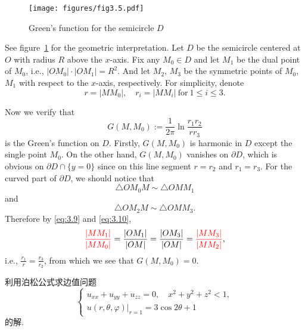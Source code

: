 \begin{solve}
  \begin{figure}
    \centering
    \texttt{[image: figures/fig3.5.pdf]}
    \caption{Green's function for the semicircle $D$}
    \label{fig:3.1}
  \end{figure}
  See figure~\ref{fig:3.1} for the geometric interpretation.
    Let $D$ be the semicircle centered at $O$ with radius $R$ above the $x$-axis.
  Fix any $M_0\in D$ and let $M_1$ be the dual point of $M_0$, i.e.,
  $|OM_0|\cdot|OM_1|=R^2$.
  And let $M_2$, $M_3$ be the symmetric points of $M_0$, $M_1$
  with respect to the $x$-axis, respectively.
  For simplicity, denote
  \[ r = |MM_0|,\quad r_i = |MM_i|\ \text{for}\ 1\leq i\leq 3. \]
  
  Now we verify that
  \[ G(M,M_0) := \frac{1}{2\pi} \ln\frac{r_1r_2}{rr_3} \]
  is the Green's function on $D$.
  Firstly, $G(M,M_0)$ is harmonic in $D$ except the single point $M_0$.
  On the other hand, $G(M,M_0)$ vanishes on $\partial D$,
  which is obvious on $\partial D\cap \{y=0\}$
  since on this line segment $r=r_2$ and $r_1=r_3$.
  For the curved part of $\partial D$, we should notice that
  \begin{equation}\label{eq:3.9}
  	\triangle OM_0M \sim \triangle OMM_1
  \end{equation}
  and
  \begin{equation}\label{eq:3.10}
  	\triangle OM_2M \sim \triangle OMM_3.
  \end{equation}
  Therefore by \eqref{eq:3.9} and \eqref{eq:3.10},
  \begin{equation}\label{eq:3.11}
  	\mathcolor{red}{\frac{|MM_1|}{|MM_0|}}
  	= \frac{|OM_1|}{|OM|}
  	= \frac{|OM_3|}{|OM|} 
  	= \mathcolor{red}{\frac{|MM_3|}{|MM_2|}},
  \end{equation}
  i.e., $\displaystyle \frac{r_1}{r} = \frac{r_3}{r_2}$, from which we see that $G(M,M_0) = 0$.
\end{solve}


\begin{exercise}
  利用泊松公式求边值问题
  \[\begin{cases}
    u_{xx} + u_{yy} + u_{zz} = 0, \quad x^2 + y^2 + z^2 < 1, \\
    u(r,\theta,\varphi)|_{r=1} = 3\cos2\theta +1
  \end{cases}\]
  的解.
\end{exercise}

